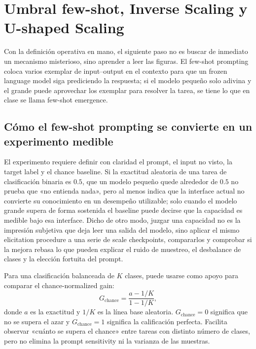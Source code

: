 \section{Umbral few-shot, Inverse Scaling y U-shaped Scaling}

Con la definición operativa en mano, el siguiente paso no es buscar de inmediato un mecanismo misterioso, sino aprender a leer las figuras. El few-shot prompting coloca varios exemplar de input--output en el contexto para que un frozen language model siga prediciendo la respuesta; si el modelo pequeño solo adivina y el grande puede aprovechar los exemplar para resolver la tarea, se tiene lo que en clase se llama few-shot emergence.

\subsection{Cómo el few-shot prompting se convierte en un experimento medible}

El experimento requiere definir con claridad el prompt, el input no visto, la target label y el chance baseline. Si la exactitud aleatoria de una tarea de clasificación binaria es $0.5$, que un modelo pequeño quede alrededor de $0.5$ no prueba que «no entienda nada», pero al menos indica que la interface actual no convierte su conocimiento en un desempeño utilizable; solo cuando el modelo grande supera de forma sostenida el baseline puede decirse que la capacidad es medible bajo esa interface. Dicho de otro modo, juzgar una capacidad no es la impresión subjetiva que deja leer una salida del modelo, sino aplicar el mismo elicitation procedure a una serie de scale checkpoints, compararlos y comprobar si la mejora rebasa lo que pueden explicar el ruido de muestreo, el desbalance de clases y la elección fortuita del prompt.


Para una clasificación balanceada de $K$ clases, puede usarse como apoyo para comparar el chance-normalized gain:
\[
G_{\mathrm{chance}}=\frac{a-1/K}{1-1/K},
\]
donde $a$ es la exactitud y $1/K$ es la línea base aleatoria. $G_{\mathrm{chance}}=0$ significa que no se supera el azar y $G_{\mathrm{chance}}=1$ significa la calificación perfecta. Facilita observar «cuánto se supera el chance» entre tareas con distinto número de clases, pero no elimina la prompt sensitivity ni la varianza de las muestras.

